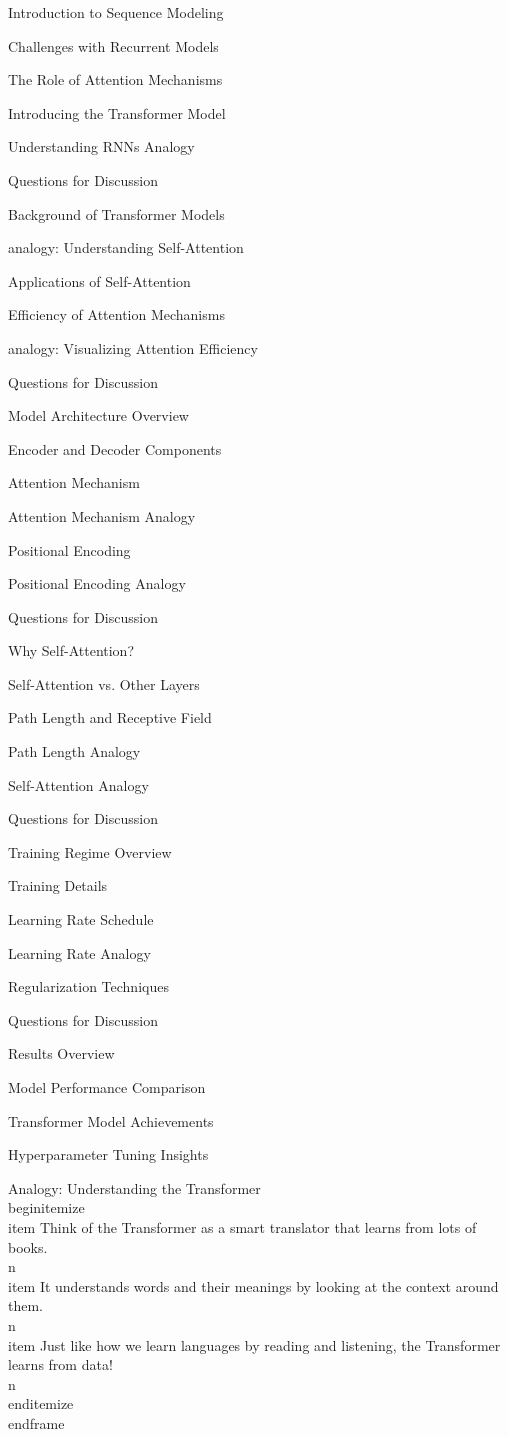 \documentclass{beamer}
\begin{document}
\begin{frame}[]{Introduction to Sequence Modeling}
\begin{frame}[]{Challenges with Recurrent Models}
\begin{frame}[]{The Role of Attention Mechanisms}
\begin{frame}[]{Introducing the Transformer Model}
\begin{frame}[plain]{Understanding RNNs Analogy}
\begin{frame}[]{Questions for Discussion}
\begin{frame}[]{Background of Transformer Models}
\begin{frame}[plain]{analogy: Understanding Self-Attention}
\begin{frame}[]{Applications of Self-Attention}
\begin{frame}[]{Efficiency of Attention Mechanisms}
\begin{frame}[plain]{analogy: Visualizing Attention Efficiency}
\begin{frame}[]{Questions for Discussion}
\begin{frame}[]{Model Architecture Overview}
\begin{frame}[]{Encoder and Decoder Components}
\begin{frame}[]{Attention Mechanism}
\begin{frame}[plain]{Attention Mechanism Analogy}
\begin{frame}[]{Positional Encoding}
\begin{frame}[plain]{Positional Encoding Analogy}
\begin{frame}[]{Questions for Discussion}
\begin{frame}[]{Why Self-Attention?}
\begin{frame}[]{Self-Attention vs. Other Layers}
\begin{frame}[]{Path Length and Receptive Field}
\begin{frame}[plain]{Path Length Analogy}
\begin{frame}[plain]{Self-Attention Analogy}
\begin{frame}[]{Questions for Discussion}
\begin{frame}[]{Training Regime Overview}
\begin{frame}[]{Training Details}
\begin{frame}[]{Learning Rate Schedule}
\begin{frame}[plain]{Learning Rate Analogy}
\begin{frame}[]{Regularization Techniques}
\begin{frame}[]{Questions for Discussion}
\begin{frame}[]{Results Overview}
\begin{frame}[]{Model Performance Comparison}
\begin{frame}[]{Transformer Model Achievements}
\begin{frame}[]{Hyperparameter Tuning Insights}
\begingroup
{}\n{}\n\begin{frame}[plain]{Analogy: Understanding the Transformer}\n\\begin{itemize}
\\item Think of the Transformer as a smart translator that learns from lots of books.\\n\\item It understands words and their meanings by looking at the context around them.\\n\\item Just like how we learn languages by reading and listening, the Transformer learns from data!\\n\\end{itemize}
\\end{frame}

\endgroup


\end{frame}
\end{frame}
\end{frame}
\end{frame}
\end{frame}
\end{frame}
\end{frame}
\end{frame}
\end{frame}
\end{frame}
\end{frame}
\end{frame}
\end{frame}
\end{frame}
\end{frame}
\end{frame}
\end{frame}
\end{frame}
\end{frame}
\end{frame}
\end{frame}
\end{frame}
\end{frame}
\end{frame}
\end{frame}
\end{frame}
\end{frame}
\end{frame}
\end{frame}
\end{frame}
\end{frame}
\end{frame}
\end{frame}
\end{frame}
\end{frame}
\end{frame}
\end{document}
